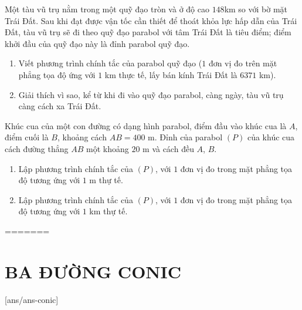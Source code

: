 \begin{bt}%
	Một tàu vũ trụ nằm trong một quỹ đạo tròn và ở độ cao $148$km so với bờ mặt Trái Đất. Sau khi đạt được vận tốc cần thiết để thoát khỏa lực hấp dẫn của Trái Đất, tàu vũ trụ sẽ đi theo quỹ đạo parabol với tâm Trái Đất là tiêu điểm; điểm khởi đầu của quỹ đạo này là đỉnh parabol quỹ đạo.
	\begin{enumerate}
		\item Viết phương trình chính tắc của parabol quỹ đạo ($1$ đơn vị đo trên mặt phẳng tọa độ ứng với $1$ km thực tế, lấy bán kính Trái Đất là $6371$ km).
		\item Giải thích vì sao, kể từ khi đi vào quỹ đạo parabol, càng ngày, tàu vũ trụ càng cách xa Trái Đất.
	\end{enumerate}

\end{bt}

\begin{bt}%
	Khúc cua của một con đường có dạng hình parabol, điểm đầu vào khúc cua là $A$, điểm cuối là $B$, khoảng cách $AB=400$ m. Đỉnh của parabol $(P)$ của khúc cua cách đường  thẳng $AB$ một khoảng $20$ m và cách đều $A$, $B$.
	\begin{enumerate}
		\item Lập phương trình chính tắc của $(P)$, với $1$ đơn vị đo trong mặt phẳng tọa độ tương ứng với $1$ m thự tế.
		\item Lập phương trình chính tắc của $(P)$, với $1$ đơn vị đo trong mặt phẳng tọa độ tương ứng với $1$ km thự tế.
	\end{enumerate}
	
\end{bt}

=======
\newpage
\setcounter{dang}{0}

\section{BA ĐƯỜNG CONIC}
[ans/ans-conic]
